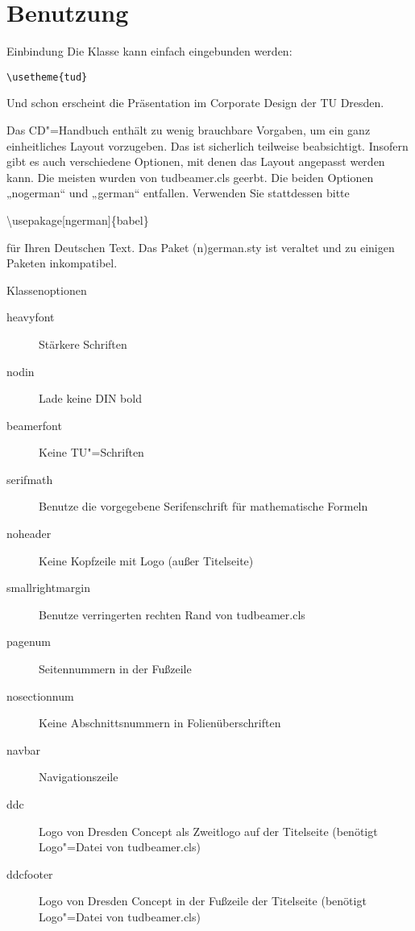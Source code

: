 \section{Benutzung}
\begin{frame}{Einbindung}
  Die Klasse kann einfach eingebunden werden:
  \begin{block}{}
    \texttt{\textbackslash usetheme\{tud\}}
  \end{block}
  Und schon erscheint die Präsentation im Corporate Design der TU Dresden. 

  Das CD"=Handbuch enthält zu wenig brauchbare Vorgaben, um ein ganz einheitliches Layout vorzugeben. Das ist sicherlich teilweise beabsichtigt. Insofern gibt es auch verschiedene Optionen, mit denen das Layout angepasst werden kann. Die meisten wurden von tudbeamer.cls geerbt. Die beiden Optionen „nogerman“ und „german“ entfallen. Verwenden Sie stattdessen bitte
  \begin{block}{}
    \textbackslash usepakage[ngerman]\{babel\}
  \end{block}
  für Ihren Deutschen Text. Das Paket (n)german.sty ist veraltet und zu einigen Paketen inkompatibel.
  \end{frame}
\begin{frame}{Klassenoptionen}
  \begin{description}
    \item[heavyfont] Stärkere Schriften
    \item[nodin] Lade keine {\dinfamily DIN bold}
    \item[beamerfont] Keine TU"=Schriften
    \item[serifmath] Benutze die vorgegebene Serifenschrift für mathematische Formeln
    \item[noheader] Keine Kopfzeile mit Logo (außer Titelseite)
    \item[smallrightmargin] Benutze verringerten rechten Rand von tudbeamer.cls
    \item[pagenum] Seitennummern in der Fußzeile
    \item[nosectionnum] Keine Abschnittsnummern in Folienüberschriften
    \item[navbar] Navigationszeile
    \item[ddc] Logo von Dresden Concept als Zweitlogo auf der Titelseite (benötigt Logo"=Datei von tudbeamer.cls) 
    \item[ddcfooter] Logo von Dresden Concept in der Fußzeile der Titelseite (benötigt Logo"=Datei von tudbeamer.cls)
  \end{description}
\end{frame}
